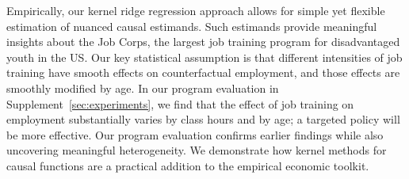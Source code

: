 Empirically, our kernel ridge regression approach allows for simple yet flexible estimation of nuanced causal estimands. Such estimands provide meaningful insights about the Job Corps, the largest job training program for disadvantaged youth in the US. Our key statistical assumption is that different intensities of job training have smooth effects on counterfactual employment, and those effects are smoothly modified by age. In our program evaluation in Supplement~\ref{sec:experiments}, we find that the effect of job training on employment substantially varies by class hours and by age; a targeted policy will be more effective. Our program evaluation confirms earlier findings while also uncovering meaningful heterogeneity. 
 We demonstrate how kernel methods for causal functions are a practical addition to the empirical economic toolkit.

